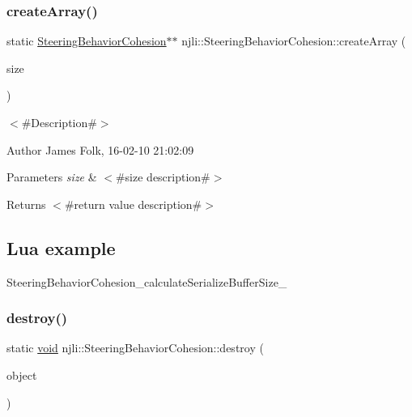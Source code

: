 \subsubsection{\texorpdfstring{create\+Array()}{createArray()}}
{\footnotesize\ttfamily static \mbox{\hyperlink{classnjli_1_1_steering_behavior_cohesion}{Steering\+Behavior\+Cohesion}}$\ast$$\ast$ njli\+::\+Steering\+Behavior\+Cohesion\+::create\+Array (\begin{DoxyParamCaption}\item[{const \mbox{\hyperlink{_util_8h_a10e94b422ef0c20dcdec20d31a1f5049}{u32}}}]{size }\end{DoxyParamCaption})\hspace{0.3cm}{\ttfamily [static]}}



$<$\#\+Description\#$>$ 

\begin{DoxyAuthor}{Author}
James Folk, 16-\/02-\/10 21\+:02\+:09
\end{DoxyAuthor}

\begin{DoxyParams}{Parameters}
{\em size} & $<$\#size description\#$>$\\
\hline
\end{DoxyParams}
\begin{DoxyReturn}{Returns}
$<$\#return value description\#$>$
\end{DoxyReturn}
\hypertarget{classnjli_1_1_steering_behavior_wander_ex1}{}\subsection{Lua example}\label{classnjli_1_1_steering_behavior_wander_ex1}

\begin{DoxyCodeInclude}
\end{DoxyCodeInclude}
Steering\+Behavior\+Cohesion\+\_\+calculate\+Serialize\+Buffer\+Size\+\_\+ \mbox{\label{classnjli_1_1_steering_behavior_cohesion_af19446195cf0c7c8787eac2dced3ebb2}} 
\subsubsection{\texorpdfstring{destroy()}{destroy()}}
{\footnotesize\ttfamily static \mbox{\hyperlink{_thread_8h_af1e856da2e658414cb2456cb6f7ebc66}{void}} njli\+::\+Steering\+Behavior\+Cohesion\+::destroy (\begin{DoxyParamCaption}\item[{\mbox{\hyperlink{classnjli_1_1_steering_behavior_cohesion}{Steering\+Behavior\+Cohesion}} $\ast$}]{object }\end{DoxyParamCaption})\hspace{0.3cm}{\ttfamily [static]}}



